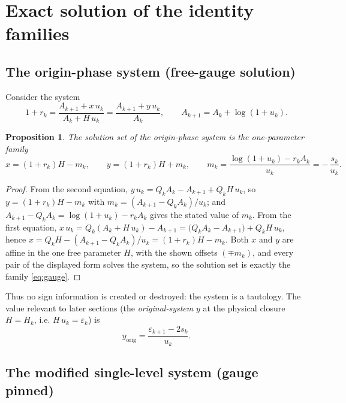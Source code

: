 \documentclass[11pt]{article}
\newtheorem{proposition}[theorem]{Proposition}
\theoremstyle{remark}
\newcommand{\Ak}{A_k}
\newcommand{\uk}{u_k}
\newcommand{\rk}{r_k}
\newcommand{\eps}{\varepsilon}
\begin{document}
\section{Exact solution of the identity families}\label{sec:families}

\subsection{The origin-phase system (free-gauge solution)}

Consider the system
\[
1+\rk=\frac{A_{k+1}+x\,\uk}{\Ak+H\,\uk}=\frac{A_{k+1}+y\,\uk}{\Ak},
\qquad A_{k+1}=\Ak+\log(1+\uk).
\]

\begin{proposition}\label{prop:gauge}
The solution set of the origin-phase system is the one-parameter family
\begin{equation}\label{eq:gauge}
x=(1+\rk)H-m_k,\qquad y=(1+\rk)H+m_k,\qquad
m_k=\frac{\log(1+\uk)-\rk \Ak}{\uk}=-\,\frac{s_k}{\uk}.
\end{equation}
\end{proposition}

\begin{proof}
From the second equation, $y\,\uk=Q_k\Ak-A_{k+1}+Q_kH\,\uk$, so
$y=(1+\rk)H-m_k$ with $m_k=(A_{k+1}-Q_k\Ak)/\uk$; and
$A_{k+1}-Q_k\Ak=\log(1+\uk)-\rk\Ak$ gives the stated value of $m_k$.
From the first equation, $x\,\uk=Q_k(\Ak+H\,\uk)-A_{k+1}
=\bigl(Q_k\Ak-A_{k+1}\bigr)+Q_kH\,\uk$, hence
$x=Q_kH-(A_{k+1}-Q_k\Ak)/\uk=(1+\rk)H-m_k$. Both $x$ and $y$ are affine in
the one free parameter $H$, with the shown offsets $(\mp m_k)$, and every pair
of the displayed form solves the system, so the solution set is exactly the
family \eqref{eq:gauge}.
\end{proof}

Thus no sign information is created or destroyed: the system is a tautology.
The value relevant to later sections (the \emph{original-system} $y$ at the
physical closure $H=H_k$, i.e. $H\,\uk=\eps_k$) is
\begin{equation}\label{eq:yorig}
y_{\mathrm{orig}}=\frac{\eps_{k+1}-2s_k}{\uk}.
\end{equation}

\subsection{The modified single-level system (gauge pinned)}
\end{document}
